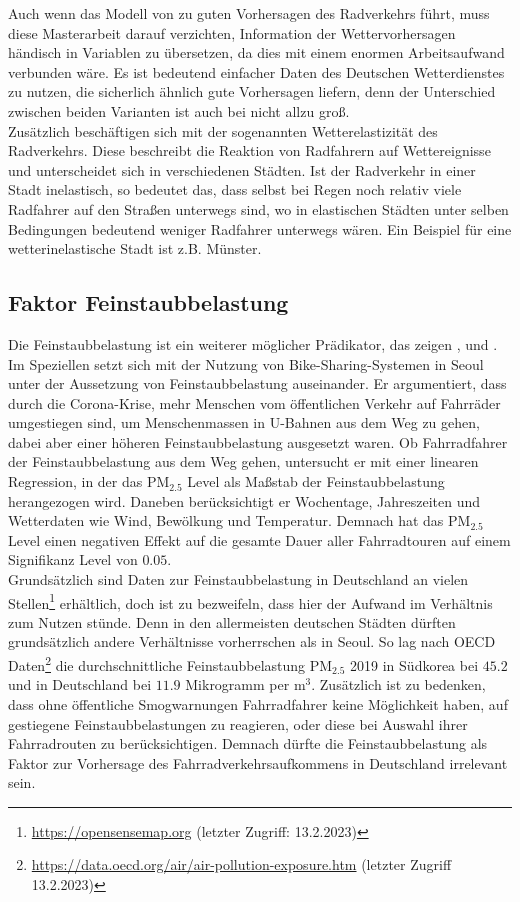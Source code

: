 \documentclass[a4paper,12pt]{thesis}
\begin{document}
Auch wenn das Modell von \cite{Wessel2020} zu guten Vorhersagen des Radverkehrs führt, muss diese Masterarbeit darauf verzichten, Information der Wettervorhersagen händisch in Variablen zu übersetzen, da dies mit einem enormen Arbeitsaufwand verbunden wäre. Es ist bedeutend einfacher Daten des Deutschen Wetterdienstes zu nutzen, die sicherlich ähnlich gute Vorhersagen liefern, denn der Unterschied zwischen beiden Varianten ist auch bei \cite{Wessel2020} nicht allzu groß.\\
Zusätzlich beschäftigen sich \cite{Goldmann2021} mit der sogenannten Wetterelastizität des Radverkehrs. Diese beschreibt die Reaktion von Radfahrern auf Wettereignisse und unterscheidet sich in verschiedenen Städten. Ist der Radverkehr in einer Stadt inelastisch, so bedeutet das, dass selbst bei Regen noch relativ viele Radfahrer auf den Straßen unterwegs sind, wo in elastischen Städten unter selben Bedingungen bedeutend weniger Radfahrer unterwegs wären. Ein Beispiel für eine wetterinelastische Stadt ist z.B. Münster.


\subsection{Faktor Feinstaubbelastung}

Die Feinstaubbelastung ist ein weiterer möglicher Prädikator, das zeigen \cite{ZHAO2018826}, \cite{Gao2022} und \cite{Hong2022}. Im Speziellen setzt sich \cite{Hong2022} mit der Nutzung von Bike-Sharing-Systemen in Seoul unter der Aussetzung von Feinstaubbelastung auseinander. Er argumentiert, dass durch die Corona-Krise, mehr Menschen vom öffentlichen Verkehr auf Fahrräder umgestiegen sind, um Menschenmassen in U-Bahnen aus dem Weg zu gehen, dabei aber einer höheren Feinstaubbelastung ausgesetzt waren. Ob Fahrradfahrer der Feinstaubbelastung aus dem Weg gehen, untersucht er mit einer linearen Regression, in der das PM$_{2.5}$ Level als Maßstab der Feinstaubbelastung herangezogen wird. Daneben berücksichtigt er Wochentage, Jahreszeiten und Wetterdaten wie Wind, Bewölkung und Temperatur. Demnach hat das PM$_{2.5}$ Level einen negativen Effekt auf die gesamte Dauer aller Fahrradtouren auf einem Signifikanz Level von $0.05$.\\
Grundsätzlich sind Daten zur Feinstaubbelastung in Deutschland an vielen Stellen\footnote{\url{https://opensensemap.org} (letzter Zugriff: 13.2.2023)} erhältlich, doch ist zu bezweifeln, dass hier der Aufwand im Verhältnis zum Nutzen stünde. Denn in den allermeisten deutschen Städten dürften grundsätzlich andere Verhältnisse vorherrschen als in Seoul. So lag nach OECD Daten\footnote{\url{https://data.oecd.org/air/air-pollution-exposure.htm} (letzter Zugriff 13.2.2023)} die durchschnittliche Feinstaubbelastung PM$_{2.5}$ 2019 in Südkorea bei $45.2$ und in Deutschland bei $11.9$ Mikrogramm per m$^3$. Zusätzlich ist zu bedenken, dass ohne öffentliche Smogwarnungen Fahrradfahrer keine Möglichkeit haben, auf gestiegene Feinstaubbelastungen zu reagieren, oder diese bei Auswahl ihrer Fahrradrouten zu berücksichtigen. Demnach dürfte die Feinstaubbelastung als Faktor zur Vorhersage des Fahrradverkehrsaufkommens in Deutschland irrelevant sein.
\end{document}
